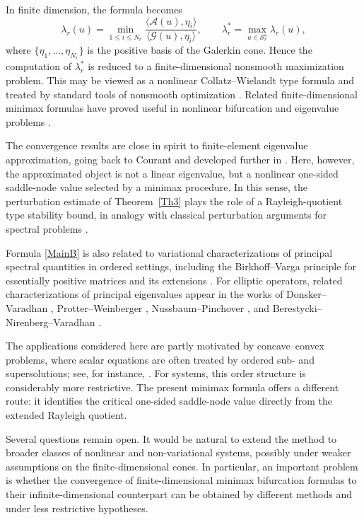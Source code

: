 \documentclass[preprint,10pt]{elsarticle}
\numberwithin{equation}{section}
\begin{document}
In finite dimension, the formula becomes
\[
\lambda_r(u)
=
\min_{1\le i\le N_r}
\frac{\langle\mathcal A(u),\eta_i\rangle}
{\langle\mathcal G(u),\eta_i\rangle},
\qquad
\lambda_r^*
=
\max_{u\in\mathcal S_r^o}\lambda_r(u),
\]
where \(\{\eta_1,\ldots,\eta_{N_r}\}\) is the positive basis of the Galerkin
cone. Hence the computation of \(\lambda_r^*\) is reduced to a
finite-dimensional nonsmooth maximization problem. This may be viewed as a
nonlinear Collatz--Wielandt type formula and treated by standard tools of
nonsmooth optimization \cite{Burke,Clark,DemyanMaloz}. Related
finite-dimensional minimax formulas have proved useful in nonlinear
bifurcation and eigenvalue problems
\cite{IvanIlya,IlIvan1,IlyasChaos,Salazar}.

The convergence results are close in spirit to finite-element eigenvalue
approximation, going back to Courant and developed further in
\cite{Babushka,ciaret,Courant}. Here, however, the approximated object is not
a linear eigenvalue, but a nonlinear one-sided saddle-node value selected by a
minimax procedure. In this sense, the perturbation estimate of
Theorem~\ref{Th3} plays the role of a Rayleigh-quotient type stability bound,
in analogy with classical perturbation arguments for spectral problems
\cite{Kato}.

Formula \eqref{MainB} is also related to variational characterizations of
principal spectral quantities in ordered settings, including the
Birkhoff--Varga principle for essentially positive matrices \cite{Varga} and
its extensions \cite{ilyasELA}. For elliptic operators, related
characterizations of principal eigenvalues appear in the works of
Donsker--Varadhan \cite{Donsker}, Protter--Weinberger \cite{Protte},
Nussbaum--Pinchover \cite{Nussbaum}, and Berestycki--Nirenberg--Varadhan
\cite{BerestyckiNV}.

The applications considered here are partly motivated by concave--convex
problems, where scalar equations are often treated by ordered sub- and
supersolutions; see, for instance, \cite{ABC,CazeEscobedo}. For systems, this
order structure is considerably more restrictive. The present minimax formula
offers a different route: it identifies the critical one-sided saddle-node
value directly from the extended Rayleigh quotient.

Several questions remain open. It would be natural to extend the method to
broader classes of nonlinear and non-variational systems, possibly under
weaker assumptions on the finite-dimensional cones. In particular, an important
problem is whether the convergence of finite-dimensional minimax bifurcation
formulas to their infinite-dimensional counterpart can be obtained by different
methods and under less restrictive hypotheses.
\end{document}
